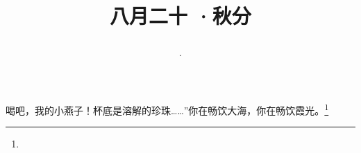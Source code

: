 \title{\date[d=22,m=9,y=2024][year:cn-y,年,month:cn,day:cn,日,·,weekday]·八月二十 ·秋分}
喝吧，我的小燕子！杯底是溶解的珍珠……”你在畅饮大海，你在畅饮霞光。\footnote{ }

